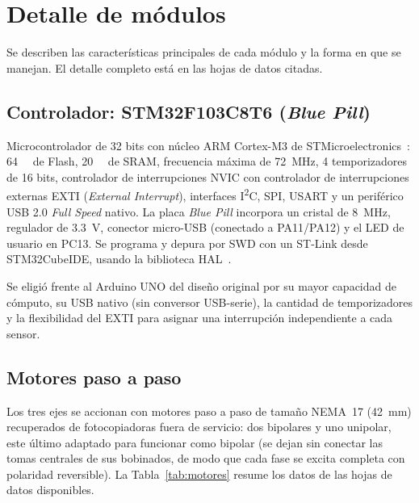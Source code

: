 \section{Detalle de módulos}\label{sec:modulos}
Se describen las características principales de cada módulo y la forma en que se manejan.
El detalle completo está en las hojas de datos citadas.

\subsection{Controlador: STM32F103C8T6 (\emph{Blue Pill})}
Microcontrolador de 32 bits con núcleo ARM Cortex-M3 de STMicroelectronics~\cite{stm32ds,rm0008}:
\SI{64}{\kilo\byte} de Flash, \SI{20}{\kilo\byte} de SRAM, frecuencia máxima de
\SI{72}{\mega\hertz}, 4 temporizadores de 16 bits, controlador de interrupciones NVIC con
controlador de interrupciones externas EXTI (\emph{External Interrupt}), interfaces
I\textsuperscript{2}C, SPI, USART y un periférico USB 2.0
\emph{Full Speed} nativo. La placa \emph{Blue Pill} incorpora un cristal de \SI{8}{\mega\hertz},
regulador de \SI{3,3}{\volt}, conector micro-USB (conectado a PA11/PA12) y el LED de usuario en
PC13. Se programa y depura por SWD con un ST-Link desde STM32CubeIDE, usando la biblioteca
HAL~\cite{hal}.

Se eligió frente al Arduino UNO del diseño original por su mayor capacidad de cómputo, su
USB nativo (sin conversor USB-serie), la cantidad de temporizadores y la flexibilidad del
EXTI para asignar una interrupción independiente a cada sensor.


\subsection{Motores paso a paso}
Los tres ejes se accionan con motores paso a paso de tamaño NEMA~17 (\SI{42}{\milli\meter})
recuperados de fotocopiadoras fuera de servicio: dos bipolares y uno unipolar, este último
adaptado para funcionar como bipolar (se dejan sin conectar las tomas centrales de sus
bobinados, de modo que cada fase se excita completa con polaridad reversible). La
Tabla~\ref{tab:motores} resume los datos de las hojas de datos disponibles.

